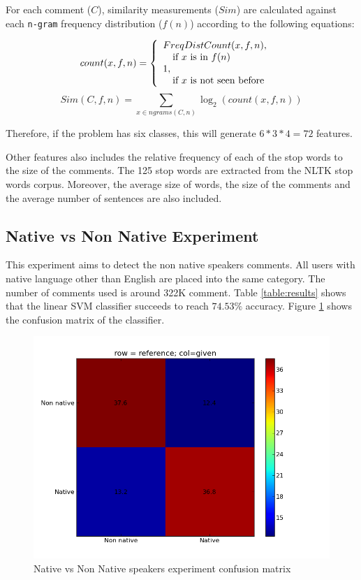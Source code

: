 \documentclass[11pt]{article}
\begin{document}
For each comment ($C$), similarity measurements ($Sim$) are calculated against each \verb+n-gram+ frequency distribution ($f(n)$) according to the following equations:

\[
  count(x, f, n) = \left\{ 
  \begin{array}{l l}
    FreqDistCount(x, f, n), & \\\quad \text{if $x$ is in $f(n)$}\\
    1,&\\\quad \text{if $x$ is not seen before}\\
  \end{array} \right.
\]
\[
  Sim(C,f,n) = \sum_{x \in ngrams(C,n)} \log_2 (count(x,f,n))
\]

Therefore, if the problem has six classes, this will generate $6*3*4 = 72$ features.

Other features also includes the relative frequency of each of the stop words to
the size of the comments. The 125 stop words are extracted from the NLTK stop
words corpus\cite{nltk}. Moreover, the average size of words, the size of the comments and the average number of sentences are also included.


\subsection{Native vs Non Native Experiment}
This experiment aims to detect the non native speakers comments. All users with native language other than English are placed into the same category. The number of comments used is around 322K comment. Table \ref{table:results} shows that the linear SVM classifier succeeds to reach $74.53\%$ accuracy. Figure \ref{non_cfm} shows the confusion matrix of the classifier.


\begin{figure}[htp]
\centering
\includegraphics[scale=0.45]{native_cfm.png}
\caption{Native vs Non Native speakers experiment confusion matrix}
\label{non_cfm}
\end{figure}
\end{document}
